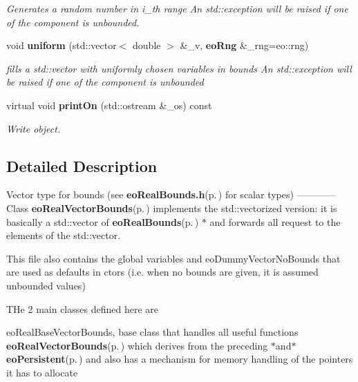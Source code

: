 \begin{CompactItemize}
\begin{CompactList}\small\item\em Generates a random number in i\_\-th range An std::exception will be raised if one of the component is unbounded. \item\end{CompactList}\item 
void {\bf uniform} (std::vector$<$ double $>$ \&\_\-v, {\bf eo\-Rng} \&\_\-rng=eo::rng)\label{classeo_real_base_vector_bounds_a21}

\begin{CompactList}\small\item\em fills a std::vector with uniformly chosen variables in bounds An std::exception will be raised if one of the component is unbounded \item\end{CompactList}\item 
virtual void {\bf print\-On} (std::ostream \&\_\-os) const 
\begin{CompactList}\small\item\em Write object. \item\end{CompactList}\end{CompactItemize}


\subsection{Detailed Description}
Vector type for bounds (see {\bf eo\-Real\-Bounds.h}{\rm (p.\,\pageref{eo_real_bounds_8h})} for scalar types) ------------ Class {\bf eo\-Real\-Vector\-Bounds}{\rm (p.\,\pageref{classeo_real_vector_bounds})} implements the std::vectorized version: it is basically a std::vector of {\bf eo\-Real\-Bounds}{\rm (p.\,\pageref{classeo_real_bounds})} $\ast$ and forwards all request to the elements of the std::vector. 

This file also contains the global variables and eo\-Dummy\-Vector\-No\-Bounds that are used as defaults in ctors (i.e. when no bounds are given, it is assumed unbounded values)

THe 2 main classes defined here are

eo\-Real\-Base\-Vector\-Bounds, base class that handles all useful functions {\bf eo\-Real\-Vector\-Bounds}{\rm (p.\,\pageref{classeo_real_vector_bounds})} which derives from the preceding $\ast$and$\ast$ {\bf eo\-Persistent}{\rm (p.\,\pageref{classeo_persistent})} and also has a mechanism for memory handling of the pointers it has to allocate 



